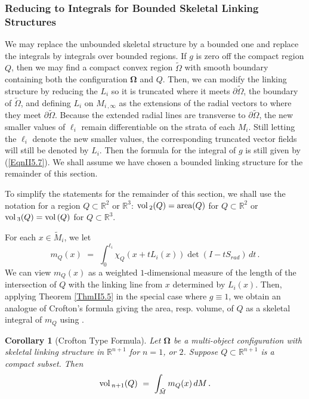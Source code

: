 \documentclass[10pt]{amsart}
\newtheorem{Corollary}[Thm]{Corollary}
\theoremstyle{definition}
\theoremstyle{definition}
\numberwithin{equation}{section}
\newcommand{\R}{{\mathbb R}}
\newcommand{\vol}{{\rm vol}\,}
\def \bgW {\boldsymbol \Omega}
\def \gW {\Omega}
\begin{document}
\subsubsection*{Reducing to Integrals for Bounded Skeletal Linking 
Structures} \par
We may replace the unbounded skeletal structure by a bounded one and 
replace the integrals by integrals over bounded regions.  If $g$ is zero off  
the compact region $Q$, then we may find a compact convex region $\tilde 
\gW$ with smooth boundary containing both the configuration $\bgW$ and 
$Q$.  Then, we can modify the linking structure by reducing the $L_i$ so it 
is truncated where it meets $\partial \tilde \gW$, the boundary of $\tilde 
\gW$, and defining $L_i$ on $M_{i\, ,\infty}$ as the extensions of the 
radial vectors to where they meet $\partial \tilde \gW$.  Because the 
extended radial lines are transverse to 
$\partial \tilde \gW$, the new smaller values of $\ell_i$
 remain differentiable on the strata of each $M_i$.  Still letting the 
$\ell_i$ denote the new smaller values, the corresponding truncated 
vector fields will still be denoted by $L_i$.  Then the formula for the 
integral of $g$ is still given by (\ref{EqnII5.7}).  We shall assume we have 
chosen a bounded linking structure for the remainder of this section. 
\par
To simplify the statements for the remainder of this section, we shall use 
the notation for a region $Q \subset \R^2$ or $\R^3$: $\vol_2(Q) = 
\text{area}(Q)$ for $Q \subset \R^2$ or $\vol_3(Q) = \vol(Q)$ for $Q 
\subset \R^3$.  \par 
For each $x  \in \tilde M_i$, we let 
\begin{equation}
\label{EqnII5.13a}
 m_Q(x) \,\, =\,\, \int_{0}^{\ell_i} \chi_Q(x + t L_i(x)) \det(I - 
t S_{rad})\, dt  \, . 
\end{equation} 
We can view $m_Q(x)$ as a weighted $1$-dimensional measure of the 
length of the intersection of $Q$ with the linking line from $x$ 
determined by $L_i(x)$. Then, applying Theorem \ref{ThmII5.5} in the 
special case where $g \equiv 1$, we obtain an analogue of Crofton\rq s 
formula giving the area, resp. volume, of $Q$ as a skeletal integral of 
$m_Q$ using \cite[Cor. 10.9]{DG}. 
\begin{Corollary}[Crofton Type Formula]
\label{CorII5.5}
Let $\bgW$ be a multi-object configuration with skeletal linking 
structure in $\R^{n+1}$ for $n = 1$, or $2$.  Suppose $Q \subset \R^{n+1}$  
is a compact subset. Then
\begin{equation}
\label{EqnII5.13b}
\vol_{n+1}(Q) \,\, = \,\,  \int_{\tilde M} m_Q(x) \, dM\, .
\end{equation} 
\end{Corollary}
\par 
\end{document}
